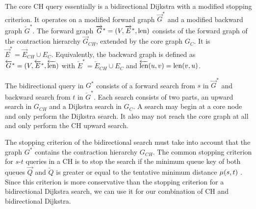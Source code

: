 The core CH query essentially is a bidirectional Dijkstra with a modified stopping criterion. It operates on a modified forward graph $\overrightarrow{G}^*$ and a modified backward graph $\overleftarrow{G}^*$. The forward graph $\overrightarrow{G}^* = (V,\overrightarrow{E}^*,\operatorname{len})$ consists of the forward graph of the contraction hierarchy $\overrightarrow{G}_{CH}$, extended by the core graph $G_C$. It is $\overrightarrow{E}^* = \overrightarrow{E}_{CH} \cup E_C $. Equivalently, the backward graph is defined as $\overleftarrow{G}^* = (V,\overleftarrow{E}^*,\overleftarrow{\operatorname{len}})$ with $\overleftarrow{E}^* = \overleftarrow{E}_{CH} \cup E_C$ and $\overleftarrow{\operatorname{len}}(u,v) = \operatorname{len}(v,u)$.

The bidirectional query in $G^*$ consists of a forward search from $s$ in $\overrightarrow{G}^*$ and backward search from $t$ in $\overleftarrow{G}^*$. Each search consists of two parts, an upward search in $G_{CH}$ and a Dijkstra search in $G_C$. A search may begin at a core node and only perform the Dijkstra search. It also may not reach the core graph at all and only perform the CH upward search.

The stopping criterion of the bidirectional search must take into account that the graph $G^*$ contains the contraction hierarchy $G_{CH}$. The common stopping criterion for $s$-$t$ queries in a CH is to stop the search if the minimum queue key of both queues $\overrightarrow{Q}$ and $\overleftarrow{Q}$ is greater or equal to the tentative minimum distance $\mu(s,t)$ \cite{geisberger:2012}. Since this criterion is more conservative than the stopping criterion for a bidirectional Dijkstra search, we can use it for our combination of CH and bidirectional Dijkstra.

